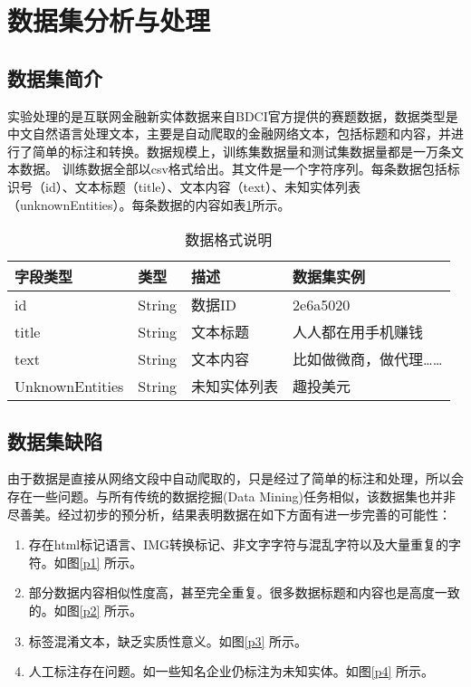 \documentclass[11pt]{article}
\begin{document}
\section{数据集分析与处理}
\subsection{数据集简介}
实验处理的是互联网金融新实体数据来自BDCI官方提供的赛题数据，数据类型是中文自然语言处理文本，主要是自动爬取的金融网络文本，包括标题和内容，并进行了简单的标注和转换。数据规模上，训练集数据量和测试集数据量都是一万条文本数据。%
训练数据全部以csv格式给出。其文件是一个字符序列。每条数据包括标识号（id）、文本标题（title）、文本内容（text）、未知实体列表（unknownEntities）。每条数据的内容如表\ref{data_description}所示。
%
\tabcolsep=12pt
\begin{table}[!ht]
    \centering
    \begin{tabular}{llll}
        \toprule
        字段类型 & 类型 & 描述 & 数据集实例\\ \midrule
        id & String & 数据ID & 2e6a5020 \\
        title & String & 文本标题 & 人人都在用手机赚钱\\
        text & String & 文本内容 & 比如做微商，做代理……\\
        UnknownEntities & String & 未知实体列表 & 趣投美元 \\ 
        \bottomrule
    \end{tabular}
    \label{data_description}
    \caption{数据格式说明}
\end{table}

\subsection{数据集缺陷}
由于数据是直接从网络文段中自动爬取的，只是经过了简单的标注和处理，所以会存在一些问题。与所有传统的数据挖掘(Data Mining)任务相似，该数据集也并非尽善美。经过初步的预分析，结果表明数据在如下方面有进一步完善的可能性：
\begin{enumerate}[label=(\roman*)]
    \item 存在html标记语言、IMG转换标记、非文字字符与混乱字符以及大量重复的字符。如图\ref{p1} 所示。
    \item 部分数据内容相似性度高，甚至完全重复。很多数据标题和内容也是高度一致的。如图\ref{p2} 所示。
    \item 标签混淆文本，缺乏实质性意义。如图\ref{p3} 所示。
    \item 人工标注存在问题。如一些知名企业仍标注为未知实体。如图\ref{p4} 所示。
\end{enumerate}
\end{document}
